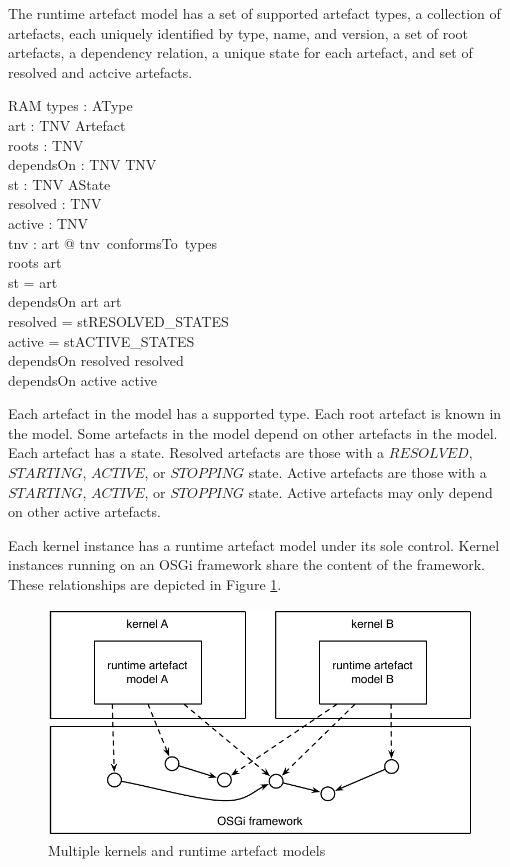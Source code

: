 \documentclass[a4paper,12pt]{article}
\begin{document}
The runtime artefact model has a set of supported artefact types, a collection of artefacts, each uniquely identified by type,
name, and version, a set of root artefacts, a dependency relation, a unique state for each artefact,
and set of resolved and actcive artefacts.
\begin{schema}{RAM}
types : \power AType \\
art : TNV \pinj Artefact \\
roots : \power TNV \\
dependsOn : TNV \rel TNV \\
st : TNV \pfun AState \\
resolved : \power TNV \\
active : \power TNV \\
\where
\forall  tnv : \dom art @ tnv~conformsTo~types \\
roots \subseteq \dom art \\
\dom st = \dom art \\
dependsOn \subseteq \dom art \cross \dom art \\
resolved = st\inv \limg RESOLVED\_STATES \rimg \\
active = st\inv \limg ACTIVE\_STATES \rimg \\
dependsOn \limg resolved \rimg \subseteq resolved \\
dependsOn \limg active \rimg \subseteq active \\
\end{schema}
Each artefact in the model has a supported type.
Each root artefact is known in the model.
Some artefacts in the model depend on other artefacts in the model.
Each artefact has a state.
Resolved artefacts are those with a $RESOLVED$, $STARTING$, $ACTIVE$, or $STOPPING$ state.
Active artefacts are those with a $STARTING$, $ACTIVE$, or $STOPPING$ state.
Active artefacts may only depend on other active artefacts.

Each kernel instance has a runtime artefact model under its sole control.
Kernel instances running on an OSGi framework share the content of the framework.
These relationships are depicted in Figure \ref{fig:kernel-rams}.
\begin{figure}[h!]
\includegraphics*[scale=1]{kernel-rams.pdf}
\caption{Multiple kernels and runtime artefact models}
\label{fig:kernel-rams}
\end{figure}
\end{document}
